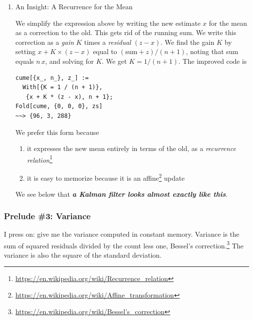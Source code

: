 \documentclass[10pt,oneside,x11names]{article}
\begin{document}
\begin{enumerate}
\item An Insight: A Recurrence for the Mean
\label{sec:orgheadline5}

We simplify the expression above by writing the new estimate \(x\) for the mean as
a correction to the old. This gets rid of the running sum. We write this
correction as a \emph{gain} \(K\) times a \emph{residual} \((z-x)\). We find the gain \(K\) by
setting \(x+K\times(z-x)\) equal to \((\textrm{sum}+z)/(n+1)\), noting that sum
equals \(n\,x\), and solving for \(K\). We get \(K=1/(n+1)\). The improved code is

\begin{verbatim}
cume[{x_, n_}, z_] :=
  With[{K = 1 / (n + 1)},
   {x + K * (z - x), n + 1};
Fold[cume, {0, 0, 0}, zs]
~~> {96, 3, 288}
\end{verbatim}

We prefer this form because
\begin{enumerate}
\item it expresses the new mean entirely in terms of the old, as a \emph{recurrence
relation}\footnote{\url{https://en.wikipedia.org/wiki/Recurrence_relation}}
\item it is easy to memorize because it is an affine\footnote{\url{https://en.wikipedia.org/wiki/Affine_transformation}} update
\end{enumerate}

We see below that
\textbf{\emph{a Kalman filter looks almost exactly like this}}.
\end{enumerate}

\subsubsection{Prelude \#3: Variance}
\label{sec:orgheadline12}

I press on: give me the variance computed in constant memory. Variance is the
sum of squared residuals divided by the count less one, Bessel's
correction.\footnote{\url{https://en.wikipedia.org/wiki/Bessel's_correction}} The variance is also the square of the standard deviation.
\end{document}
